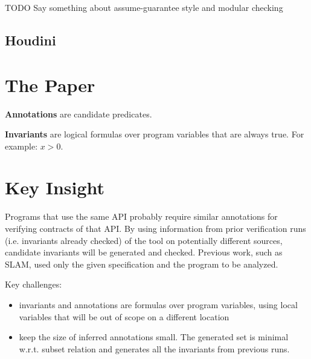 \documentclass[12pt]{article}
\begin{document}
TODO Say something about assume-guarantee style and modular checking

\subsection{Houdini}


%
%
%
%

\section{The Paper}

\textbf{Annotations} are candidate predicates. 

\textbf{Invariants} are logical formulas over program variables that are always true. For example: $x>0$. 

\section{Key Insight}
Programs that use the same API probably require similar annotations for verifying contracts of that API.  
By using information from prior verification runs (i.e. invariants already checked) of the tool on potentially different sources, candidate invariants will be generated and checked. Previous work, such as SLAM, used only the given specification and the program to be analyzed.

Key challenges:
\begin{itemize}
\item invariants and annotations are formulas over program variables, using local variables that will be out of scope on a different location
\item keep the size of inferred annotations small. The generated set is minimal w.r.t. subset relation and generates all the invariants from previous runs.
\end{itemize}



\end{document}
